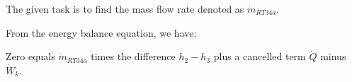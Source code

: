 The given task is to find the mass flow rate denoted as \( \dot{m}_{RT34a} \).

From the energy balance equation, we have:

Zero equals \( \dot{m}_{RT34a} \) times the difference \( h_2 - h_3 \) plus a cancelled term \( \dot{Q} \) minus \( \dot{W}_k \).
